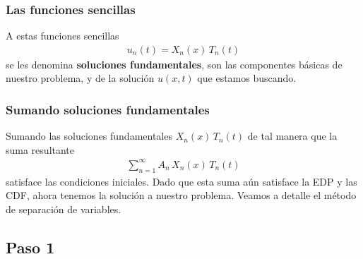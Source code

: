 \documentclass[12pt]{beamer}
\begin{document}
\begin{frame}
\frametitle{Las funciones sencillas}
A estas funciones sencillas
\begin{align*}
u_{n} (t) = X_{n} (x) \, T_{n}(t)
\end{align*}
\pause
se les denomina \textbf{soluciones fundamentales}, son las componentes básicas de nuestro problema, y de la solución $u (x, t)$ que estamos buscando.
\end{frame}
\begin{frame}
\frametitle{Sumando soluciones fundamentales}
Sumando las soluciones fundamentales $X_{n}(x) \, T_{n} (t)$ de tal manera que la suma resultante
\pause
\begin{align*}
\sum_{n=1}^{\infty} A_{n} \, X_{n} (x) \, T_{n} (t)
\end{align*}
\pause
satisface las condiciones iniciales. \pause Dado que esta suma aún satisface la EDP y las CDF, ahora tenemos la solución a nuestro problema. Veamos a detalle el método de separación de variables.
\end{frame}

\subsection{Paso 1}
\end{document}
